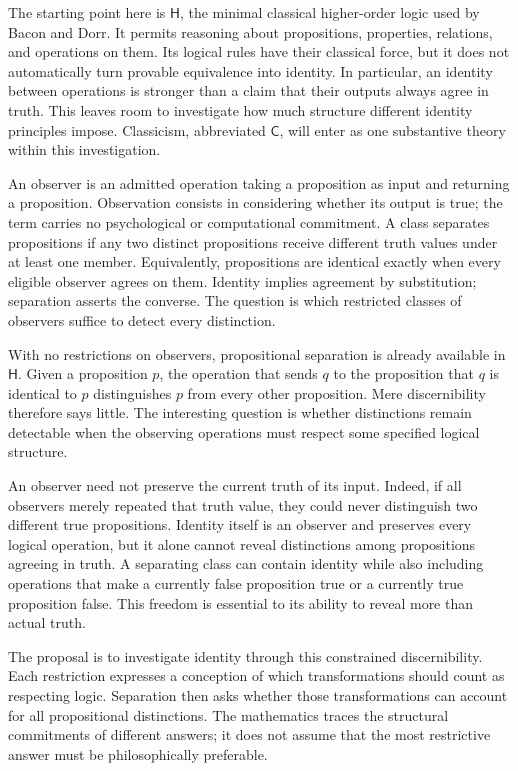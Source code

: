 \documentclass[12pt,letterpaper]{article}
\newcommand{\Hlogic}{\mathsf{H}}
\newcommand{\C}{\mathsf{C}}
\begin{document}
The starting point here is $\Hlogic$, the minimal classical higher-order logic used by Bacon and Dorr. It permits reasoning about propositions, properties, relations, and operations on them. Its logical rules have their classical force, but it does not automatically turn provable equivalence into identity. In particular, an identity between operations is stronger than a claim that their outputs always agree in truth. This leaves room to investigate how much structure different identity principles impose. Classicism, abbreviated $\C$, will enter as one substantive theory within this investigation.~\cite{r1}


An observer is an admitted operation taking a proposition as input and returning a proposition. Observation consists in considering whether its output is true; the term carries no psychological or computational commitment. A class separates propositions if any two distinct propositions receive different truth values under at least one member. Equivalently, propositions are identical exactly when every eligible observer agrees on them. Identity implies agreement by substitution; separation asserts the converse. The question is which restricted classes of observers suffice to detect every distinction.


With no restrictions on observers, propositional separation is already available in $\Hlogic$. Given a proposition $p$, the operation that sends $q$ to the proposition that $q$ is identical to $p$ distinguishes $p$ from every other proposition. Mere discernibility therefore says little. The interesting question is whether distinctions remain detectable when the observing operations must respect some specified logical structure.


An observer need not preserve the current truth of its input. Indeed, if all observers merely repeated that truth value, they could never distinguish two different true propositions. Identity itself is an observer and preserves every logical operation, but it alone cannot reveal distinctions among propositions agreeing in truth. A separating class can contain identity while also including operations that make a currently false proposition true or a currently true proposition false. This freedom is essential to its ability to reveal more than actual truth.


The proposal is to investigate identity through this constrained discernibility. Each restriction expresses a conception of which transformations should count as respecting logic. Separation then asks whether those transformations can account for all propositional distinctions. The mathematics traces the structural commitments of different answers; it does not assume that the most restrictive answer must be philosophically preferable.
\end{document}
